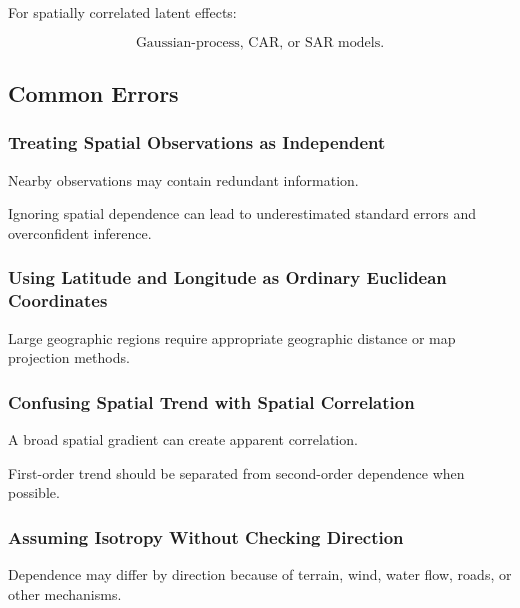For spatially correlated latent effects:

\[
\boxed{
\text{Gaussian-process, CAR, or SAR models}.
}
\]

\subsection{Common Errors}
\label{subsec:spatial-common-errors}

\subsubsection{Treating Spatial Observations as Independent}

Nearby observations may contain redundant information.

Ignoring spatial dependence can lead to underestimated standard errors
and overconfident inference.

\subsubsection{Using Latitude and Longitude as Ordinary Euclidean Coordinates}

Large geographic regions require appropriate geographic distance or map
projection methods.

\subsubsection{Confusing Spatial Trend with Spatial Correlation}

A broad spatial gradient can create apparent correlation.

First-order trend should be separated from second-order dependence when
possible.

\subsubsection{Assuming Isotropy Without Checking Direction}

Dependence may differ by direction because of terrain, wind, water flow,
roads, or other mechanisms.


